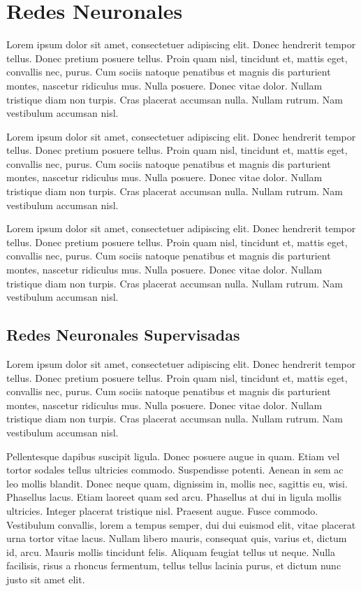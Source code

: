 \chapter{Redes Neuronales}
\label{cha:redes}

Lorem ipsum dolor sit amet, consectetuer adipiscing elit.  Donec
hendrerit tempor tellus.  Donec pretium posuere tellus.  Proin quam
nisl, tincidunt et, mattis eget, convallis nec, purus.  Cum sociis
natoque penatibus et magnis dis parturient montes, nascetur ridiculus
mus.  Nulla posuere.  Donec vitae dolor.  Nullam tristique diam non
turpis.  Cras placerat accumsan nulla.  Nullam rutrum.  Nam vestibulum
accumsan nisl.

Lorem ipsum dolor sit amet, consectetuer adipiscing elit.  Donec
hendrerit tempor tellus.  Donec pretium posuere tellus.  Proin quam
nisl, tincidunt et, mattis eget, convallis nec, purus.  Cum sociis
natoque penatibus et magnis dis parturient montes, nascetur ridiculus
mus.  Nulla posuere.  Donec vitae dolor.  Nullam tristique diam non
turpis.  Cras placerat accumsan nulla.  Nullam rutrum.  Nam vestibulum
accumsan nisl.

Lorem ipsum dolor sit amet, consectetuer adipiscing elit.  Donec
hendrerit tempor tellus.  Donec pretium posuere tellus.  Proin quam
nisl, tincidunt et, mattis eget, convallis nec, purus.  Cum sociis
natoque penatibus et magnis dis parturient montes, nascetur ridiculus
mus.  Nulla posuere.  Donec vitae dolor.  Nullam tristique diam non
turpis.  Cras placerat accumsan nulla.  Nullam rutrum.  Nam vestibulum
accumsan nisl.


\section{Redes Neuronales Supervisadas}

Lorem ipsum dolor sit amet, consectetuer adipiscing elit.  Donec
hendrerit tempor tellus.  Donec pretium posuere tellus.  Proin quam
nisl, tincidunt et, mattis eget, convallis nec, purus.  Cum sociis
natoque penatibus et magnis dis parturient montes, nascetur ridiculus
mus.  Nulla posuere.  Donec vitae dolor.  Nullam tristique diam non
turpis.  Cras placerat accumsan nulla.  Nullam rutrum.  Nam vestibulum
accumsan nisl.

Pellentesque dapibus suscipit ligula.  Donec posuere augue in quam.
Etiam vel tortor sodales tellus ultricies commodo.  Suspendisse
potenti.  Aenean in sem ac leo mollis blandit.  Donec neque quam,
dignissim in, mollis nec, sagittis eu, wisi.  Phasellus lacus.  Etiam
laoreet quam sed arcu.  Phasellus at dui in ligula mollis ultricies.
Integer placerat tristique nisl.  Praesent augue.  Fusce commodo.
Vestibulum convallis, lorem a tempus semper, dui dui euismod elit,
vitae placerat urna tortor vitae lacus.  Nullam libero mauris,
consequat quis, varius et, dictum id, arcu.  Mauris mollis tincidunt
felis.  Aliquam feugiat tellus ut neque.  Nulla facilisis, risus a
rhoncus fermentum, tellus tellus lacinia purus, et dictum nunc justo
sit amet elit.


